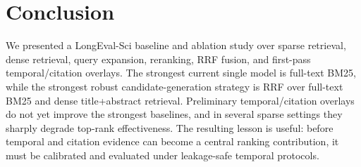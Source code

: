 \documentclass[11pt]{article}
\begin{document}
\section{Conclusion}

We presented a LongEval-Sci baseline and ablation study over sparse retrieval, dense retrieval, query expansion, reranking, RRF fusion, and first-pass temporal/citation overlays. The strongest current single model is full-text BM25, while the strongest robust candidate-generation strategy is RRF over full-text BM25 and dense title+abstract retrieval. Preliminary temporal/citation overlays do not yet improve the strongest baselines, and in several sparse settings they sharply degrade top-rank effectiveness. The resulting lesson is useful: before temporal and citation evidence can become a central ranking contribution, it must be calibrated and evaluated under leakage-safe temporal protocols.



\end{document}
